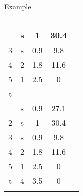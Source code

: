 \begin{frame}{Example}
\begin{columns}[c]
{\begin{tabular}{| c | c | c | c | c |}
{    2& s & 1 & 30.4\\ \hline
    3& s & 0.9 & 9.8\\ \hline
    4& 2 & 1.8 & 11.6\\ \hline
    5& 1 & 2.5 & 0\\ \hline
    t& & &\\ \hline
    }\only<14->{1& s & 0.9 & 27.1\\ \hline
    2& s & 1 & 30.4\\ \hline
    3& s & 0.9 & 9.8\\ \hline
    4& 2 & 1.8 & 11.6\\ \hline
    5& 1 & 2.5 & 0\\ \hline
    t & 4 & 3.5 & 0\\ \hline
    }
  \end{tabular}
}

\end{columns}
\end{frame}

